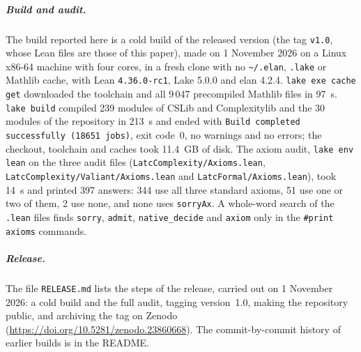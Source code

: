 \documentclass[pdflatex,sn-mathphys-num]{sn-jnl}
\theoremstyle{thmstyleone}
\theoremstyle{thmstylethree}
\begin{document}
\begin{appendices}
\subparagraph*{Build and audit.}
The build reported here is a cold build of the released version (the tag \texttt{v1.0}, whose
Lean files are those of this paper), made on 1 November 2026 on a Linux x86-64 machine with four cores, in a
fresh clone with no \texttt{\textasciitilde/.elan}, \texttt{.lake} or Mathlib cache, with Lean
\texttt{4.36.0-rc1}, Lake 5.0.0 and elan 4.2.4. \texttt{lake exe cache get} downloaded the
toolchain and all 9\,047 precompiled Mathlib files in 97~s. \texttt{lake build} compiled 239
modules of CSLib and Complexitylib and the 30 modules of the repository in 213~s and ended with
\texttt{Build completed successfully (18651 jobs)}, exit code~0, no warnings and no errors; the
checkout, toolchain and caches took 11.4~GB of disk. The axiom audit, \texttt{lake env lean} on
the three audit files (\texttt{LatcComplexity/Axioms.lean}, \texttt{LatcComplexity/Valiant/Axioms.lean}
and \texttt{LatcFormal/Axioms.lean}), took 14~s and printed 397 answers: 344 use all three
standard axioms, 51 use one or two of them, 2 use none, and none uses \lstinline{sorryAx}. A
whole-word search of the \texttt{.lean} files finds \lstinline{sorry}, \texttt{admit},
\texttt{native\_decide} and \texttt{axiom} only in the \texttt{\#print axioms} commands.

\subparagraph*{Release.}
The file \texttt{RELEASE.md} lists the steps of the release, carried out on 1 November 2026:
a cold build and the full audit, tagging version~1.0, making the repository public, and
archiving the tag on Zenodo (\url{https://doi.org/10.5281/zenodo.23860668}). The
commit-by-commit history of earlier builds is in the README.

\end{appendices}


\end{document}
